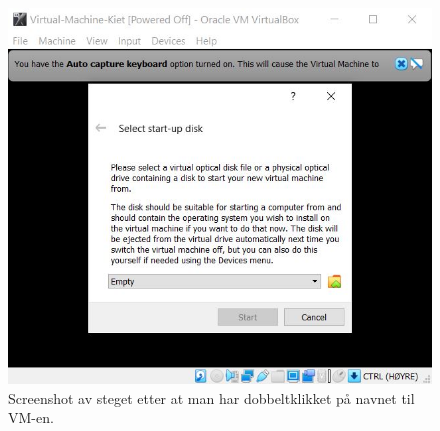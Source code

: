 \begin{figure}[ht]
    \centering
    \includegraphics[scale = .66]{Main/figures/VM-ISO.JPG}
    \caption{Screenshot av steget etter at man har dobbeltklikket på navnet til VM-en.}
    \label{fig:vm-ISO}
\end{figure}
